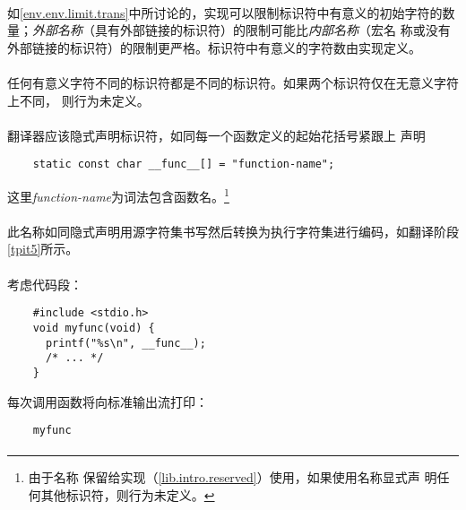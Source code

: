 \implimit
\paragraph{}
如\ref{env.env.limit.trans}中所讨论的，实现可以限制标识符中有意义的初始字符的数
量；\textit{外部名称}（具有外部链接的标识符）的限制可能比\textit{内部名称}（宏名
称或没有外部链接的标识符）的限制更严格。标识符中有意义的字符数由实现定义。

\paragraph{}
任何有意义字符不同的标识符都是不同的标识符。如果两个标识符仅在无意义字符上不同，
则行为未定义。


\semantic
\paragraph{}
翻译器应该隐式声明标识符，如同每一个函数定义的起始花括号紧跟上
声明
\begin{lstlisting}
    static const char __func__[] = "function-name";
\end{lstlisting}
这里\textit{function-name}为词法包含函数名。\footnote{由于名称
保留给实现（\ref{lib.intro.reserved}）使用，如果使用名称显式声
明任何其他标识符，则行为未定义。}

\paragraph{}
此名称如同隐式声明用源字符集书写然后转换为执行字符集进行编码，如翻译阶段
\ref{tpit5}所示。

\paragraph{}
\ex* 考虑代码段：
\begin{lstlisting}
    #include <stdio.h>
    void myfunc(void) {
      printf("%s\n", __func__);
      /* ... */
    }
\end{lstlisting}
每次调用函数将向标准输出流打印：
\begin{lstlisting}
    myfunc
\end{lstlisting}


\syntax
\paragraph{}


